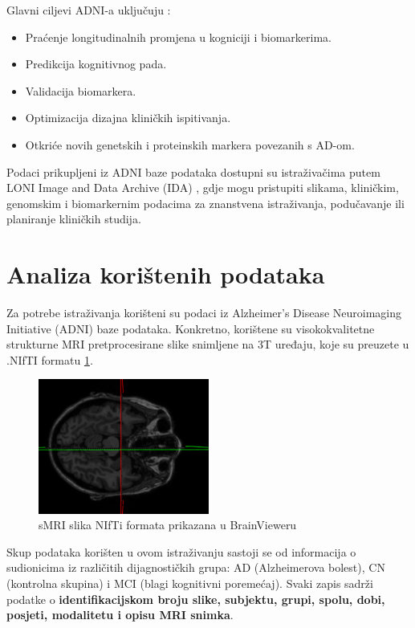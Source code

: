 \documentclass[zavrsnirad]{fer}
\begin{document}
Glavni ciljevi ADNI-a uključuju \cite{adni_about}:
\begin{itemize}
	\item Praćenje longitudinalnih promjena u kogniciji i biomarkerima.
	\item Predikcija kognitivnog pada.
	\item Validacija biomarkera.
	\item Optimizacija dizajna kliničkih ispitivanja.
	\item Otkriće novih genetskih i proteinskih markera povezanih s AD-om.
\end{itemize}

Podaci prikupljeni iz ADNI baze podataka dostupni su istraživačima putem LONI Image and Data Archive (IDA) \cite{usc_loni}, gdje mogu pristupiti slikama, kliničkim, genomskim i biomarkernim podacima za znanstvena istraživanja, podučavanje ili planiranje kliničkih studija.

\section{Analiza korištenih podataka}
Za potrebe istraživanja korišteni su podaci iz Alzheimer's Disease Neuroimaging Initiative (ADNI) baze podataka. Konkretno, korištene su visokokvalitetne strukturne MRI pretprocesirane slike snimljene na 3T uređaju, koje su preuzete u .NIfTI formatu \ref{fig:nifti}.

\begin{figure}[h]
	\centering
	\includegraphics[width=0.5\textwidth]{Figures/primjer_slike.png}
	\caption{sMRI slika NIfTi formata prikazana u BrainVieweru\cite{umich_brainviewer}}
	\label{fig:nifti}
\end{figure}


Skup podataka korišten u ovom istraživanju sastoji se od informacija o sudionicima iz različitih dijagnostičkih grupa: AD (Alzheimerova bolest), CN (kontrolna skupina) i MCI (blagi kognitivni poremećaj). Svaki zapis sadrži podatke o \textbf{identifikacijskom broju slike, subjektu, grupi, spolu, dobi, posjeti, modalitetu i opisu MRI snimka}.
\end{document}
